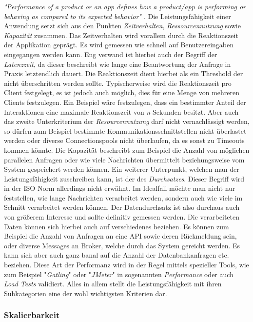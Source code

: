 \emph{"Performance of a product or an app defines how a product/app is performing or behaving as compared to its expected behavior" \cite{nfr-dotnetcurry}}. Die Leistungsfähigkeit einer Anwendung setzt sich aus den Punkten \emph{Zeitverhalten}, \emph{Ressourcennutzung} sowie \emph{Kapazität} zusammen. Das Zeitverhalten wird vorallem durch die Reaktionszeit der Applikation geprägt. Es wird gemessen wie schnell auf Benutzereingaben eingegangen werden kann. Eng verwand ist hierbei auch der Begriff der \emph{Latenzzeit}, da dieser beschreibt wie lange eine Beantwortung der Anfrage in Praxis letztendlich dauert. Die Reaktionszeit dient hierbei als ein Threshold der nicht überschritten werden sollte. Typischerweise wird die Reaktionszeit pro Client festgelegt, es ist jedoch auch möglich, dies für eine Menge von mehreren Clients festzulegen. Ein Beispiel wäre festzulegen, dass ein bestimmter Anteil der Interaktionen eine maximale Reaktionszeit von \emph{n} Sekunden besitzt. Aber auch das zweite Unterkriterium der \emph{Resourcennutzung} darf nicht vernachlässigt werden, so dürfen zum Beispiel bestimmte Kommunikationsschnittstellen nicht überlastet werden oder diverse Connectionspools nicht überlaufen, da es sonst zu Timeouts kommen könnte. Die Kapazität beschreibt zum Beispiel die Anzahl von möglichen parallelen Anfragen oder wie viele Nachrichten übermittelt beziehungsweise vom System gespeichert werden können. Ein weiterer Unterpunkt, welchen man der Leistungsfähigkeit zuschreiben kann, ist der des \emph{Durchsatzes}. Dieser Begriff wird in der ISO Norm allerdings nicht erwähnt. Im Idealfall möchte man nicht nur feststellen, wie lange Nachrichten verarbeitet werden, sondern auch wie viele im Schnitt verarbeitet werden können. Der Datendurchsatz ist also durchaus auch von größerem Interesse und sollte definitiv gemessen werden. Die verarbeiteten Daten können sich hierbei auch auf verschiedenes beziehen. Es können zum Beispiel die Anzahl von Anfragen an eine API sowie deren Rückmeldung sein, oder diverse Messages an Broker, welche durch das System gereicht werden. Es kann sich aber auch ganz banal auf die Anzahl der Datenbankanfragen etc. beziehen. Diese Art der Performanz wird in der Regel mittels spezieller Tools, wie zum Beispiel "\emph{Gatling}" oder  "\emph{JMeter}" in sogenannten \emph{Performance} oder auch \emph{Load Tests} validiert. Alles in allem stellt die Leistungsfähigkeit mit ihren Subkategorien eine der wohl wichtigsten Kriterien dar. 


\subsubsection{Skalierbarkeit}
